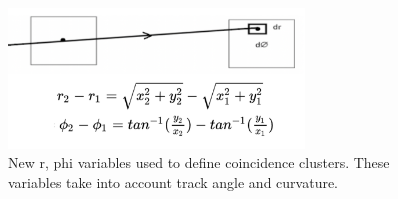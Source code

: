 \begin{figure}[!htp]
\centering
\includegraphics[width=0.7\textwidth]{ashish_thesis/dr_dphi_variables1_1.png}
\caption[New Variables For Two Fold Coincidences]{%
  New r, phi variables used to define coincidence clusters. These variables take into account track angle and curvature.
}
\label{fig:drdphi_diagram}
\end{figure}

